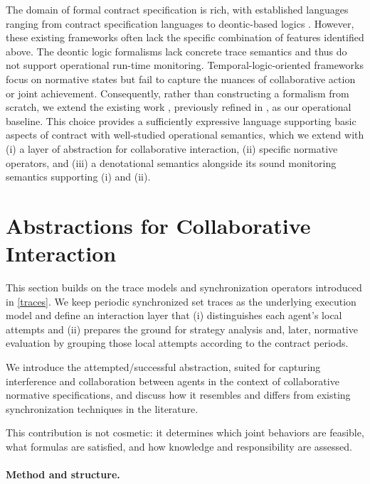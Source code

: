 The domain of formal contract specification is rich, with established languages ranging from contract specification languages \cite{HvitvedKZ12,diaz2013specification,farmer2016fcl} to deontic-based logics \cite{governatori2005representing,azzopardi2021}.  However, these existing frameworks often lack the specific combination of features identified above. The deontic logic formalisms lack concrete trace semantics and thus do not support operational run-time monitoring. Temporal-logic-oriented frameworks focus on normative states but fail to capture the nuances of collaborative action or joint achievement.  Consequently, rather than constructing a formalism from scratch, we extend the existing work \cite{Azzopardi2016}, previously refined in \cite{Kharraz23}, as our operational baseline. This choice provides a sufficiently expressive language supporting basic aspects of contract with well-studied operational semantics, which we extend with (i) a layer of abstraction for collaborative interaction, (ii) specific normative operators, and (iii) a denotational semantics alongside its sound monitoring semantics supporting (i) and (ii).



\section{Abstractions for Collaborative Interaction}

\label{sec:multiagent-sync}



This section builds on the trace models and synchronization operators introduced in \ref{traces}. We keep periodic synchronized set traces as the underlying execution model and define an interaction layer that (i) distinguishes each agent's local attempts  and (ii) prepares the ground for strategy analysis and, later, normative evaluation by grouping those local attempts according to the contract periods.

We introduce the attempted/successful abstraction, suited for capturing interference and collaboration between agents in the context of collaborative normative specifications, and discuss how it resembles and differs from existing synchronization techniques in the literature.

 This contribution is not cosmetic: it determines which joint behaviors are feasible, what formulas are satisfied, and how knowledge and responsibility are assessed.


 \paragraph{Method and structure.}

